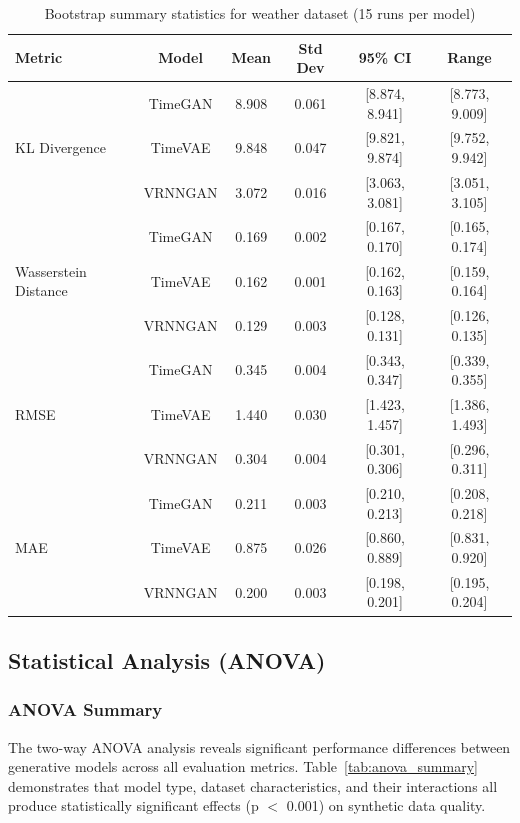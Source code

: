 \documentclass[11pt]{article}
\begin{document}
\begin{table}[H]
    \centering
    \caption{Bootstrap summary statistics for weather dataset (15 runs per model)}
    \label{tab:bootstrap_weather}
    \small
    \begin{tabular}{lccccc}
        \toprule
        \textbf{Metric} & \textbf{Model} & \textbf{Mean} & \textbf{Std Dev} & \textbf{95\% CI} & \textbf{Range} \\
        \midrule
        \multirow{3}{*}{KL Divergence} 
    & TimeGAN   & 8.908 & 0.061 & [8.874, 8.941] & [8.773, 9.009] \\
    & TimeVAE   & 9.848 & 0.047 & [9.821, 9.874] & [9.752, 9.942] \\
    & VRNNGAN   & 3.072 & 0.016 & [3.063, 3.081] & [3.051, 3.105] \\
    \midrule
    \multirow{3}{*}{Wasserstein Distance} 
    & TimeGAN   & 0.169 & 0.002 & [0.167, 0.170] & [0.165, 0.174] \\
    & TimeVAE   & 0.162 & 0.001 & [0.162, 0.163] & [0.159, 0.164] \\
    & VRNNGAN   & 0.129 & 0.003 & [0.128, 0.131] & [0.126, 0.135] \\
    \midrule
    \multirow{3}{*}{RMSE} 
    & TimeGAN   & 0.345 & 0.004 & [0.343, 0.347] & [0.339, 0.355] \\
    & TimeVAE   & 1.440 & 0.030 & [1.423, 1.457] & [1.386, 1.493] \\
    & VRNNGAN   & 0.304 & 0.004 & [0.301, 0.306] & [0.296, 0.311] \\
    \midrule
    \multirow{3}{*}{MAE} 
    & TimeGAN   & 0.211 & 0.003 & [0.210, 0.213] & [0.208, 0.218] \\
    & TimeVAE   & 0.875 & 0.026 & [0.860, 0.889] & [0.831, 0.920] \\
    & VRNNGAN   & 0.200 & 0.003 & [0.198, 0.201] & [0.195, 0.204] \\
    \bottomrule
\end{tabular}
\end{table}

\subsection{Statistical Analysis (ANOVA)}

\subsubsection{ANOVA Summary}

The two-way ANOVA analysis reveals significant performance differences between generative models across all evaluation metrics. Table~\ref{tab:anova_summary} demonstrates that model type, dataset characteristics, and their interactions all produce statistically significant effects (p $<$ 0.001) on synthetic data quality.
\end{document}

